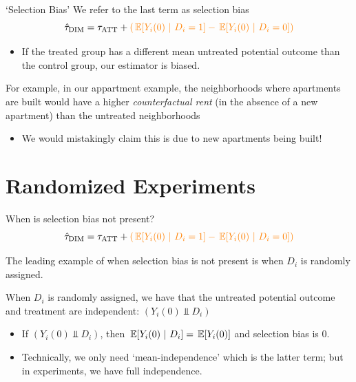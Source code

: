 \documentclass[aspectratio=169,t,11pt,table]{beamer}
\begin{document}
\begin{frame}{`Selection Bias'}
  We refer to the last term as {\color{orange} selection bias}
  $$
    \hat{\tau}_{\text{DIM}} = \tau_{\text{ATT}} + {\color{orange} \left( \expec{Y_{i}(0)}{D_i = 1} - \expec{Y_{i}(0)}{D_i = 0} \right) }
  $$

  \begin{itemize}
    \item If the treated group has a different mean untreated potential outcome than the control group, our estimator is biased.
  \end{itemize}

  \pause
  \bigskip
  For example, in our appartment example, the neighborhoods where apartments are built would have a higher \emph{counterfactual rent} (in the absence of a new apartment) than the untreated neighborhoods
  \begin{itemize}
    \item We would mistakingly claim this is due to new apartments being built!
  \end{itemize}
\end{frame}

\section{Randomized Experiments}

\begin{frame}{When is selection bias not present?}
  \vspace*{-\bigskipamount}
  $$
    \hat{\tau}_{\text{DIM}} = \tau_{\text{ATT}} + {\color{orange} \left( \expec{Y_{i}(0)}{D_i = 1} - \expec{Y_{i}(0)}{D_i = 0} \right) }
  $$

  \bigskip
  The leading example of when selection bias is not present is when $D_i$ is randomly assigned.
  
  \pause
  \bigskip
  When $D_i$ is randomly assigned, we have that the untreated potential outcome and treatment are independent: $(Y_i(0) \Perp D_i)$
  \begin{itemize}
    \item If $(Y_i(0) \Perp D_i)$, then $\expec{Y_{i}(0)}{D_i} = \expec{Y_{i}(0)}$ and selection bias is 0.

    \pause 
    \item Technically, we only need `mean-independence' which is the latter term; but in experiments, we have full independence.
  \end{itemize}
\end{frame}
\end{document}
